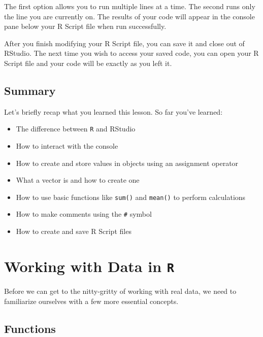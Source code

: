 \documentclass[
  letterpaper,
]{book}
\providecommand{\tightlist}{%
  \setlength{\itemsep}{0pt}\setlength{\parskip}{0pt}}\usepackage{longtable,booktabs,array}
\begin{document}
The first option allows you to run multiple lines at a time. The second
runs only the line you are currently on. The results of your code will
appear in the console pane below your R Script file when run
successfully.

After you finish modifying your R Script file, you can save it and close
out of RStudio. The next time you wish to access your saved code, you
can open your R Script file and your code will be exactly as you left
it.

\hypertarget{summary}{%
\section{Summary}\label{summary}}

Let's briefly recap what you learned this lesson. So far you've learned:

\begin{itemize}
\tightlist
\item
  The difference between \texttt{R} and RStudio
\item
  How to interact with the console
\item
  How to create and store values in objects using an assignment operator
\item
  What a vector is and how to create one
\item
  How to use basic functions like \texttt{sum()} and \texttt{mean()} to
  perform calculations
\item
  How to make comments using the \texttt{\#} symbol
\item
  How to create and save R Script files
\end{itemize}


\hypertarget{working-with-data-in-r}{%
\chapter{\texorpdfstring{Working with Data in
\texttt{R}}{Working with Data in R}}\label{working-with-data-in-r}}

Before we can get to the nitty-gritty of working with real data, we need
to familiarize ourselves with a few more essential concepts.

\hypertarget{functions}{%
\section{Functions}\label{functions}}
\end{document}
